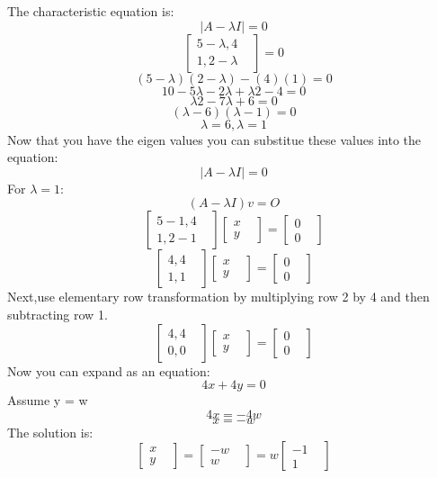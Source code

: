 The characteristic equation is: 
$$|A - \lambda I| = 0$$ 
$$\begin{bmatrix}
5 - \lambda,4 &\\
 1,2- \lambda& 
\end{bmatrix} = 0$$
$$(5 - \lambda) (2 - \lambda) - (4)(1) = 0$$
$$10 - 5\lambda - 2\lambda + \lambda2 - 4 = 0$$
$$\lambda2 - 7\lambda + 6 = 0$$
$$(\lambda - 6)(\lambda - 1) = 0$$
$$\lambda = 6, \lambda = 1$$
Now that you have the eigen values you can substitue these values into the equation: 
$$|A - \lambda I| = 0$$ 
For $λ = 1$:
$$(A - \lambda I) v = O$$
$$\begin{bmatrix}
5-1, 4 &  \\
 1, 2-1& 
\end{bmatrix}
\begin{bmatrix}
x&  \\
 y& 
\end{bmatrix} = 
\begin{bmatrix}
0&  \\
0& 
\end{bmatrix}$$
$$\begin{bmatrix}
4, 4 &  \\
 1, 1& 
\end{bmatrix}
\begin{bmatrix}
x&  \\
 y& 
\end{bmatrix} = 
\begin{bmatrix}
0&  \\
0& 
\end{bmatrix}$$
Next,use elementary row transformation by multiplying row 2 by 4 and then subtracting row 1.
$$\begin{bmatrix}
4, 4 &  \\
 0, 0& 
\end{bmatrix}
\begin{bmatrix}
x&  \\
 y& 
\end{bmatrix} = 
\begin{bmatrix}
0&  \\
0& 
\end{bmatrix}$$
Now you can expand as an equation:
$$4x + 4y = 0$$
Assume y = w
$$4x = -4w$$
$$x = -w$$
The solution is:
$$\begin{bmatrix}
x&  \\
y& 
\end{bmatrix} = 
\begin{bmatrix}
-w&  \\
w& 
\end{bmatrix} = 
w\begin{bmatrix}
-1&  \\
1&
\end{bmatrix}$$
